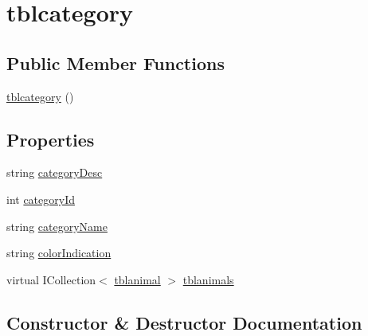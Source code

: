 \hypertarget{classWildLifeTracker_1_1tblcategory}{}\section{tblcategory}
\label{classWildLifeTracker_1_1tblcategory}
\subsection*{Public Member Functions}
\begin{DoxyCompactItemize}
\item 
\hyperlink{classWildLifeTracker_1_1tblcategory_a1a4ae07dab4a80f5272e38cd3d0b2e19}{tblcategory} ()
\end{DoxyCompactItemize}
\subsection*{Properties}
\begin{DoxyCompactItemize}
\item 
string \hyperlink{classWildLifeTracker_1_1tblcategory_ae992743f1fc0d9386b609d8871a4bd6b}{category\+Desc}
\item 
int \hyperlink{classWildLifeTracker_1_1tblcategory_a423f91c56dc35040d661cfbe357f7c78}{category\+Id}
\item 
string \hyperlink{classWildLifeTracker_1_1tblcategory_a1eca787c85e1bc45b49bbd281d4106fd}{category\+Name}
\item 
string \hyperlink{classWildLifeTracker_1_1tblcategory_a0ecdefcc99a4b41b1ef3a04167756366}{color\+Indication}
\item 
virtual I\+Collection$<$ \hyperlink{classWildLifeTracker_1_1tblanimal}{tblanimal} $>$ \hyperlink{classWildLifeTracker_1_1tblcategory_acde66266ee81c53bf73df2c0b3be64c2}{tblanimals}
\end{DoxyCompactItemize}


\subsection{Constructor \& Destructor Documentation}
\mbox{\label{classWildLifeTracker_1_1tblcategory_a1a4ae07dab4a80f5272e38cd3d0b2e19}} 
